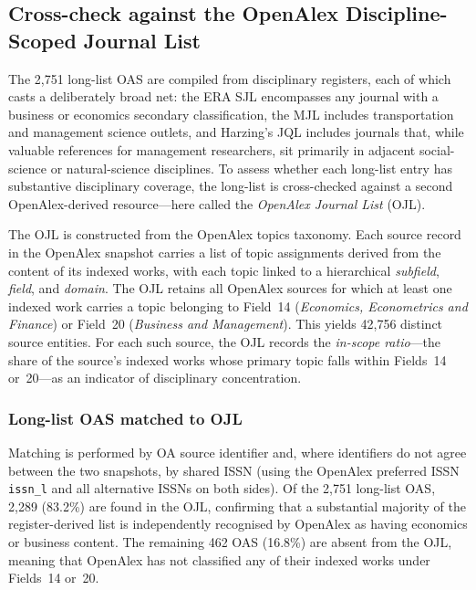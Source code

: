 \subsection{Cross-check against the OpenAlex Discipline-Scoped Journal List}
\label{sec:ojl_crosscheck}

The 2{,}751 long-list OAS are compiled from disciplinary registers,
each of which casts a deliberately broad net:
the ERA SJL encompasses any journal with a business or economics secondary classification,
the MJL includes transportation and management science outlets,
and Harzing's JQL includes journals that, while valuable references for management
researchers, sit primarily in adjacent social-science or natural-science disciplines.
To assess whether each long-list entry has substantive disciplinary coverage,
the long-list is cross-checked against a second OpenAlex-derived resource---here
called the \textit{OpenAlex Journal List} (OJL).

The OJL is constructed from the OpenAlex topics taxonomy.
Each source record in the OpenAlex snapshot carries a list of topic assignments derived
from the content of its indexed works, with each topic linked to a hierarchical
\textit{subfield}, \textit{field}, and \textit{domain}.
The OJL retains all OpenAlex sources for which at least one indexed work carries a
topic belonging to Field~14 (\textit{Economics, Econometrics and Finance}) or
Field~20 (\textit{Business and Management}).
This yields 42{,}756 distinct source entities.
For each such source, the OJL records the \textit{in-scope ratio}---the share of
the source's indexed works whose primary topic falls within Fields~14 or~20---as an
indicator of disciplinary concentration.

\subsubsection*{Long-list OAS matched to OJL}

Matching is performed by OA source identifier and, where identifiers do not agree
between the two snapshots, by shared ISSN (using the OpenAlex preferred ISSN
\texttt{issn\_l} and all alternative ISSNs on both sides).
Of the 2{,}751 long-list OAS, 2{,}289 (83.2\%) are found in the OJL,
confirming that a substantial majority of the register-derived list is independently
recognised by OpenAlex as having economics or business content.
The remaining 462 OAS (16.8\%) are absent from the OJL, meaning that OpenAlex
has not classified any of their indexed works under Fields~14 or~20.

